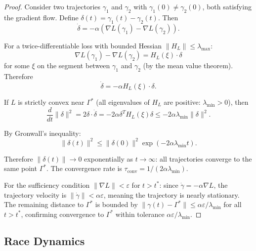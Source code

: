 \documentclass[twocolumn,10pt]{article}
\theoremstyle{remark}
\newcommand{\eps}{\varepsilon}
\begin{document}
\begin{proof}
Consider two trajectories $\gamma_1$ and $\gamma_2$ with $\gamma_1(0) \neq \gamma_2(0)$, both satisfying the gradient flow. Define $\delta(t) = \gamma_1(t) - \gamma_2(t)$. Then
\begin{equation}
\dot{\delta} = -\alpha(\nabla L(\gamma_1) - \nabla L(\gamma_2)).
\end{equation}

For a twice-differentiable loss with bounded Hessian $\|H_L\| \leq \lambda_{\max}$:
\begin{equation}
\nabla L(\gamma_1) - \nabla L(\gamma_2) = H_L(\xi) \cdot \delta
\end{equation}
for some $\xi$ on the segment between $\gamma_1$ and $\gamma_2$ (by the mean value theorem). Therefore
\begin{equation}
\dot{\delta} = -\alpha H_L(\xi) \cdot \delta.
\end{equation}

If $L$ is strictly convex near $\Gamma^*$ (all eigenvalues of $H_L$ are positive: $\lambda_{\min} > 0$), then
\begin{equation}
\frac{d}{dt}\|\delta\|^2 = 2\delta \cdot \dot{\delta} = -2\alpha \delta^T H_L(\xi) \delta \leq -2\alpha \lambda_{\min} \|\delta\|^2.
\end{equation}

By Gronwall's inequality:
\begin{equation}
\|\delta(t)\|^2 \leq \|\delta(0)\|^2 \exp(-2\alpha \lambda_{\min} t).
\end{equation}

Therefore $\|\delta(t)\| \to 0$ exponentially as $t \to \infty$: all trajectories converge to the same point $\Gamma^*$. The convergence rate is $\tau_{\mathrm{conv}} = 1/(2\alpha \lambda_{\min})$.

For the sufficiency condition $\|\nabla L\| < \eps$ for $t > t^*$: since $\dot{\gamma} = -\alpha \nabla L$, the trajectory velocity is $\|\dot{\gamma}\| < \alpha\eps$, meaning the trajectory is nearly stationary. The remaining distance to $\Gamma^*$ is bounded by $\|\gamma(t) - \Gamma^*\| \leq \alpha\eps / \lambda_{\min}$ for all $t > t^*$, confirming convergence to $\Gamma^*$ within tolerance $\alpha\eps/\lambda_{\min}$.
\end{proof}

\subsection{Race Dynamics}
\end{document}
